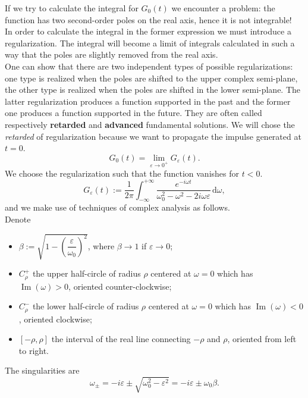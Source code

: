 \documentclass[a4paper,11pt]{article}	%
\theoremstyle{classicthm}
\theoremstyle{definition}
\theoremstyle{definition}
\newcommand\ds{\displaystyle}
\renewcommand{\Im}{\operatorname{Im}}
\newcommand{\dd}{\mathrm d}
\renewcommand{\epsilon}{\varepsilon}
\begin{document}
\noindent If we try to calculate the integral for $G_0(t)$ we encounter a problem: the function has two second-order poles on the real axis, hence it is not integrable!\\
In order to calculate the integral in the former expression we must introduce a regularization. The integral will become a limit of integrals calculated in such a way that the poles are slightly removed from the real axis.\\ One can show that there are two independent types of possible regularizations: one type is realized when the poles are shifted to the upper complex semi-plane, the other type is realized when the poles are shifted in the lower semi-plane. The latter regularization produces a function supported in the past and the former one produces a function supported in the future. They are often called respectively \textbf{retarded} and \textbf{advanced} fundamental solutions. We will chose the \emph{retarded} of regularization because we want to propagate the impulse generated at $t=0$.
\[	G_0(t)=\lim_{\epsilon\to0^+}G_\epsilon(t).	\]
We choose the regularization such that the function vanishes for $t<0$.
\[G_\epsilon(t):=\frac1{2\pi}\int_{-\infty}^{+\infty}\frac{e^{-i\omega t}}{\omega_0^2-\omega^2-2i\omega\epsilon}\,\dd\omega,\]
and we make use of techniques of complex analysis as follows.\\
\noindent Denote
\begin{itemize}
	\item $\ds\beta:=\sqrt{1-\left(\dfrac{\epsilon}{\omega_0}\right)^2}$, where $\beta\to1$ if $\epsilon\to 0$;
	\item $C_\rho^+$ the upper half-circle of radius $\rho$ centered at $\omega=0$ which has $\Im(\omega)>0$, oriented counter-clockwise;
	\item $C_\rho^-$ the lower half-circle of radius $\rho$ centered at $\omega=0$ which has $\Im(\omega)<0$, oriented clockwise;
	\item $[-\rho,\rho]$ the interval of the real line connecting $-\rho$ and $\rho$, oriented from left to right.
\end{itemize}
The singularities are
\[\omega_\pm=-i\epsilon\pm\sqrt{\omega_0^2-\epsilon^2}= -i\epsilon\pm\omega_0\beta.\]
\end{document}

